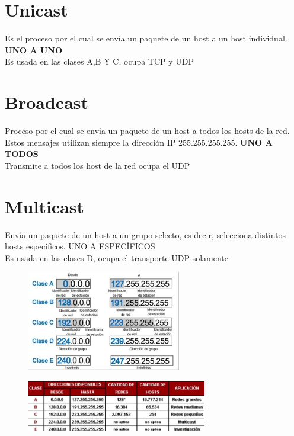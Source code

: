 \documentclass[letterpaper,12pt]{article}
\begin{document}
\begin{sloppypar}
\section{Unicast}
Es el proceso por el cual se envía un paquete de un host a un host individual. \textbf{UNO A UNO}
\vspace{0.3cm}\\ 
Es usada en las clases A,B Y C, ocupa TCP y UDP

\section{Broadcast}
Proceso por el cual se envía un paquete de un host a todos los hosts de la red. Estos mensajes utilizan siempre la dirección IP 255.255.255.255. \textbf{UNO A TODOS}
\vspace{0.3cm}\\ 
Transmite a todos los host de la red ocupa el UDP

\section{Multicast}
Envía un paquete de un host a un grupo selecto, es decir, selecciona distintos hosts específicos. UNO A ESPECÍFICOS
\vspace{0.3cm}\\ 
Es usada en las clases D, ocupa el transporte UDP solamente

\begin{figure}[H]
    \centering
    \includegraphics[width=0.6\textwidth]{images/redes 1.png}
\end{figure}


\begin{figure}[H]
    \centering
    \includegraphics[width=0.7\textwidth]{images/redes2.png}
\end{figure}


\end{sloppypar}
\end{document}
